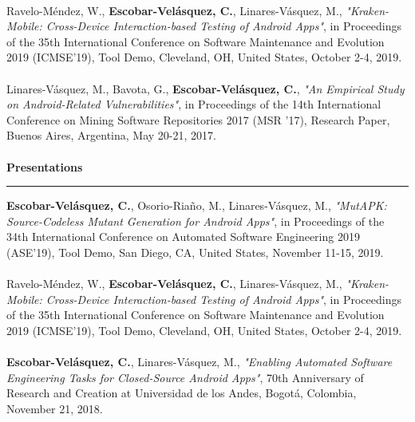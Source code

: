 \documentclass[letterpaper,11pt,oneside]{article}
\begin{document}
\\
\noindent [c2] Ravelo-Méndez, W., \textbf{Escobar-Velásquez, C.}, Linares-Vásquez, M., \textit{"Kraken-Mobile: Cross-Device Interaction-based Testing of Android Apps"}, in Proceedings of the 35th International Conference on Software Maintenance and Evolution 2019 (ICMSE’19), Tool Demo, Cleveland, OH, United States, October 2-4, 2019. \\
\\
\noindent [c1] Linares-Vásquez, M., Bavota, G., \textbf{Escobar-Velásquez, C.}, \textit{"An Empirical Study on Android-Related Vulnerabilities"}, in Proceedings of the 14th International Conference on Mining Software Repositories 2017 (MSR ’17), Research Paper, Buenos Aires, Argentina, May 20-21, 2017. \\
\\
\noindent \Large{\textbf{Presentations}} \\
\vspace{-2ex}
\hrule 
\normalsize
\vspace{2ex}
\noindent [p3] \textbf{Escobar-Velásquez, C.}, Osorio-Riaño, M., Linares-Vásquez, M., \textit{"MutAPK: Source-Codeless Mutant Generation for Android Apps"}, in Proceedings of the 34th International Conference on Automated Software Engineering 2019 (ASE’19), Tool Demo, San Diego, CA, United States, November 11-15, 2019. \\
\\
\noindent [p2] Ravelo-Méndez, W., \textbf{Escobar-Velásquez, C.}, Linares-Vásquez, M., \textit{"Kraken-Mobile: Cross-Device Interaction-based Testing of Android Apps"}, in Proceedings of the 35th International Conference on Software Maintenance and Evolution 2019 (ICMSE’19), Tool Demo, Cleveland, OH, United States, October 2-4, 2019. \\
\\
\noindent [p1] \textbf{Escobar-Velásquez, C.}, Linares-Vásquez, M., \textit{"Enabling Automated Software Engineering Tasks for Closed-Source Android Apps"}, 70th Anniversary of Research and Creation at Universidad de los Andes, Bogotá, Colombia, November 21, 2018. \\
\\

\end{document}
